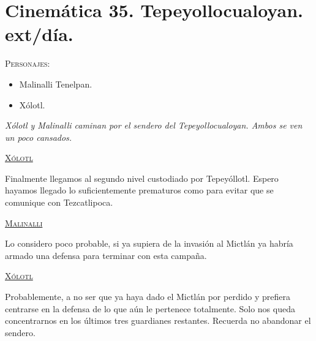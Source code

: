 \documentclass[11pt,letterpaper]{article}
\begin{document}
\section{Cinemática 35. Tepeyollocualoyan. ext/día. }
 \textsc{Personajes}:
 \begin{itemize}
 \item Malinalli Tenelpan.
\item Xólotl.
 \end{itemize}
\textit{Xólotl y Malinalli caminan por el sendero del Tepeyollocualoyan. Ambos se ven un poco cansados. }
\begin{center}
\textsc{\underline{Xólotl}}
\\
\par
Finalmente llegamos al segundo nivel custodiado por Tepeyóllotl. Espero hayamos llegado lo suficientemente prematuros como para evitar que se comunique con Tezcatlipoca.
\\
\par
\textsc{\underline{Malinalli}}
\\
\par
Lo considero poco probable, si ya supiera de la invasión al Mictlán ya habría armado una defensa para terminar con esta campaña.
\\
\par
\textsc{\underline{Xólotl}}
\\
\par
Probablemente, a no ser que ya haya dado el Mictlán por perdido y prefiera centrarse en la defensa de lo que aún le pertenece totalmente. Solo nos queda concentrarnos en los últimos tres guardianes restantes. Recuerda no abandonar el sendero.
\end{center}
\end{document}
